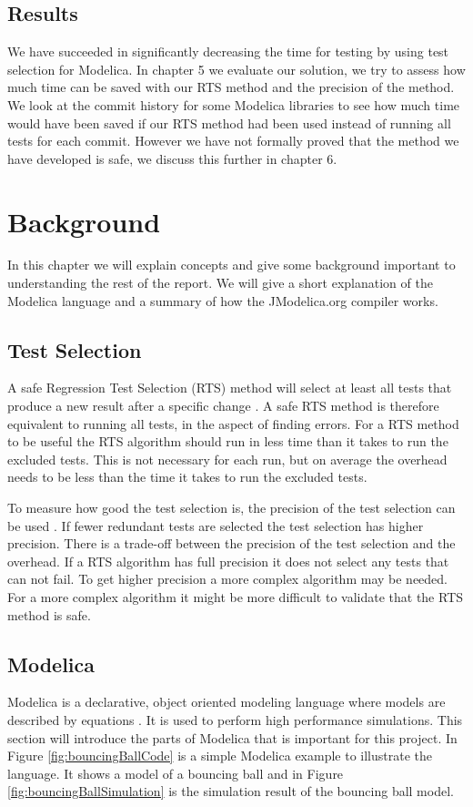 \documentclass{cslthse-msc}
\begin{document}
\section{Results}
We have succeeded in significantly decreasing the time for testing by using test selection for Modelica. In chapter 5 we evaluate our solution, we try to assess how much time can be saved with our RTS method and the precision of the method. We look at the commit history for some Modelica libraries to see how much time would have been saved if our RTS method had been used instead of running all tests for each commit. However we have not formally proved that the method we have developed is safe, we discuss this further in chapter 6.

\chapter[Background]{Background}
In this chapter we will explain concepts and give some background important to understanding the rest of the report. We will give a short explanation of the Modelica language and a summary of how the JModelica.org compiler works.

\section{Test Selection}
A safe Regression Test Selection (RTS) method will select at least all tests that produce a new result after a specific change \cite{DBLP:conf/pppj/OqvistHM16}. A safe RTS method is therefore equivalent to running all tests, in the aspect of finding errors. For a RTS method to be useful the RTS algorithm should run in less time than it takes to run the excluded tests. This is not necessary for each run, but on average the overhead needs to be less than the time it takes to run the excluded tests.

To measure how good the test selection is, the precision of the test selection can be used \cite{DBLP:conf/sigsoft/LegunsenHSLZM16}. If fewer redundant tests are selected the test selection has higher precision. There is a trade-off between the precision of the test selection and the overhead. If a RTS algorithm has full precision it does not select any tests that can not fail. To get higher precision a more complex algorithm may be needed. For a more complex algorithm it might be more difficult to validate that the RTS method is safe.

\section{Modelica}
Modelica is a declarative, object oriented modeling language where models are described by equations \cite{modelicamodelica}. It is used to perform high performance simulations. This section will introduce the parts of Modelica that is important for this project. In Figure \ref{fig:bouncingBallCode} is a simple Modelica example to illustrate the language. It shows a model of a bouncing ball and in Figure \ref{fig:bouncingBallSimulation} is the simulation result of the bouncing ball model.
\end{document}
